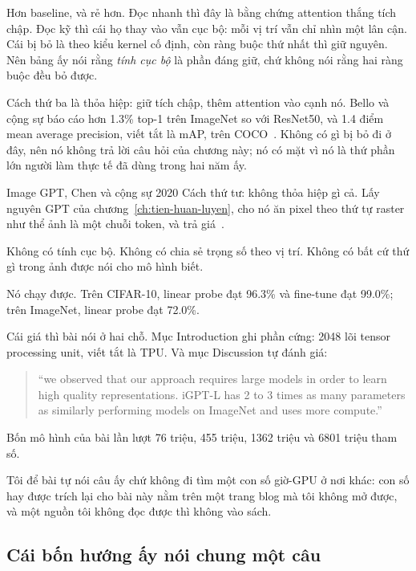 Hơn baseline, và rẻ hơn. Đọc nhanh thì đây là bằng chứng attention thắng tích
chập. Đọc kỹ thì cái họ thay vào vẫn cục bộ: mỗi vị trí vẫn chỉ nhìn một lân
cận. Cái bị bỏ là  theo kiểu kernel cố
định, còn ràng buộc thứ nhất thì giữ nguyên. Nên bảng ấy nói rằng \emph{tính cục bộ} là phần đáng giữ,
chứ không nói rằng hai ràng buộc đều bỏ được.

Cách thứ ba là thỏa hiệp: giữ tích chập, thêm attention vào cạnh nó. Bello và
cộng sự báo cáo hơn 1.3\% top-1 trên ImageNet so với ResNet50, và 1.4 điểm
mean average precision, viết tắt là mAP, trên
COCO~\autocite{bello2019attention}. Không có gì bị bỏ đi ở đây, nên nó không
trả lời câu hỏi của chương này; nó có mặt vì nó là thứ phần lớn người làm thực
tế đã dùng trong hai năm ấy.

\begin{bridge}{Image GPT, Chen và cộng sự 2020}
Cách thứ tư: không thỏa hiệp gì cả. Lấy nguyên GPT của
chương~\ref{ch:tien-huan-luyen}, cho nó ăn pixel theo thứ tự raster như thể ảnh
là một chuỗi token, và trả giá~\autocite{chen2020igpt}.

Không có tính cục bộ. Không có chia sẻ trọng số theo vị trí. Không có bất cứ
thứ gì trong ảnh được nói cho mô hình biết.

Nó chạy được. Trên CIFAR-10, linear probe đạt 96.3\% và fine-tune đạt 99.0\%;
trên ImageNet, linear probe đạt 72.0\%.

Cái giá thì bài nói ở hai chỗ. Mục Introduction ghi phần cứng: 2048 lõi tensor
processing unit, viết tắt là TPU. Và
mục Discussion tự đánh giá:

\begin{quote}
\enquote{we observed that our approach requires large models in order to learn
high quality representations. iGPT-L has 2 to 3 times as many parameters as
similarly performing models on ImageNet and uses more compute.}
\end{quote}

Bốn mô hình của bài lần lượt 76 triệu, 455 triệu, 1362 triệu và 6801 triệu tham
số.

Tôi để bài tự nói câu ấy chứ không đi tìm một con số giờ-GPU ở nơi khác: con số
hay được trích lại cho bài này nằm trên một trang blog mà tôi không mở được, và
một nguồn tôi không đọc được thì không vào sách.
\end{bridge}

\subsection*{Cái bốn hướng ấy nói chung một câu}

